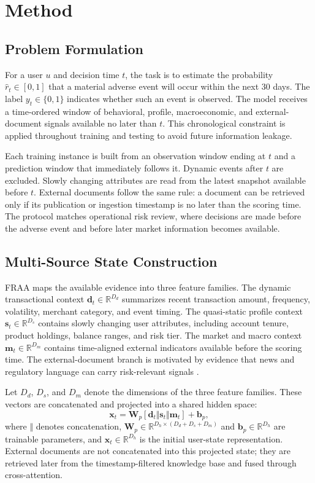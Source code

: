 \documentclass[runningheads]{llncs}
\begin{document}
\section{Method}
\label{sec:method}

\subsection{Problem Formulation}
For a user $u$ and decision time $t$, the task is to estimate the probability $\hat{r}_t \in [0,1]$ that a material adverse event will occur within the next 30 days. The label $y_t \in \{0,1\}$ indicates whether such an event is observed. The model receives a time-ordered window of behavioral, profile, macroeconomic, and external-document signals available no later than $t$. This chronological constraint is applied throughout training and testing to avoid future information leakage.

Each training instance is built from an observation window ending at $t$ and a prediction window that immediately follows it. Dynamic events after $t$ are excluded. Slowly changing attributes are read from the latest snapshot available before $t$. External documents follow the same rule: a document can be retrieved only if its publication or ingestion timestamp is no later than the scoring time. The protocol matches operational risk review, where decisions are made before the adverse event and before later market information becomes available.

\subsection{Multi-Source State Construction}
FRAA maps the available evidence into three feature families. The dynamic transactional context $\mathbf{d}_t \in \mathbb{R}^{D_d}$ summarizes recent transaction amount, frequency, volatility, merchant category, and event timing. The quasi-static profile context $\mathbf{s}_t \in \mathbb{R}^{D_s}$ contains slowly changing user attributes, including account tenure, product holdings, balance ranges, and risk tier. The market and macro context $\mathbf{m}_t \in \mathbb{R}^{D_m}$ contains time-aligned external indicators available before the scoring time. The external-document branch is motivated by evidence that news and regulatory language can carry risk-relevant signals \cite{tetlock2007giving,loughran2011liability}.

Let $D_d$, $D_s$, and $D_m$ denote the dimensions of the three feature families. These vectors are concatenated and projected into a shared hidden space:
\begin{equation}
\mathbf{x}_t = \mathbf{W}_p [\mathbf{d}_t \Vert \mathbf{s}_t \Vert \mathbf{m}_t] + \mathbf{b}_p,
\label{eq:state_projection}
\end{equation}
where $\Vert$ denotes concatenation, $\mathbf{W}_p \in \mathbb{R}^{D_h \times (D_d+D_s+D_m)}$ and $\mathbf{b}_p \in \mathbb{R}^{D_h}$ are trainable parameters, and $\mathbf{x}_t \in \mathbb{R}^{D_h}$ is the initial user-state representation. External documents are not concatenated into this projected state; they are retrieved later from the timestamp-filtered knowledge base and fused through cross-attention.
\end{document}
